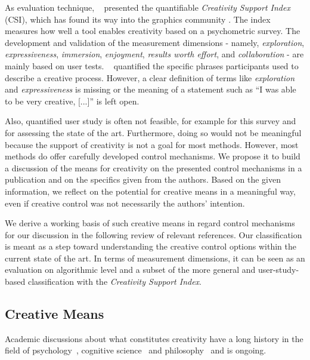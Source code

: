 As evaluation technique, \citeauthor*{cherry_2014_qcs}~\cite{cherry_2014_qcs} presented the quantifiable \textit{Creativity Support Index} (CSI), which has found its way into the graphics community \cite{shugrina_2017_ppi}. The index measures how well a tool enables creativity based on a psychometric survey. The development and validation of the measurement dimensions - namely, \textit{exploration}, \textit{expressiveness}, \textit{immersion}, \textit{enjoyment}, \textit{results worth effort}, and \textit{collaboration} - are mainly based on user tests. \citeauthor*{cherry_2014_qcs}~\cite{cherry_2014_qcs} quantified the specific phrases participants used to describe a creative process. However, a clear definition of terms like \textit{exploration} and \textit{expressiveness} is missing or the meaning of a statement such as ``I was able to be very creative, [...]'' is left open. 

Also, quantified user study is often not feasible, for example for this survey and for assessing the state of the art. Furthermore, doing so would not be meaningful because the support of creativity is not a goal for most methods. However, most methods do offer carefully developed control mechanisms. We propose it to build a discussion of the means for creativity on the presented control mechanisms in a publication and on the specifics given from the authors. Based on the given information, we reflect on the potential for creative means in a meaningful way, even if creative control was not necessarily the authors' intention. 

We derive a working basis of such creative means in regard control mechanisms for our discussion in the following review of relevant references. Our classification is meant as a step toward understanding the creative control options within the current state of the art. In terms of measurement dimensions, it can be seen as an evaluation on algorithmic level and a subset of the more general and user-study-based classification with the \textit{Creativity Support Index}. 

\subsection{Creative Means}
\label{subsec:creative_means}

Academic discussions about what constitutes creativity have a long history in the field of psychology~\cite{weisberg_2006_cui}, cognitive science~\cite{boden_2004_cmm} and philosophy~\cite{gaut_2010_pc} and is ongoing. 

